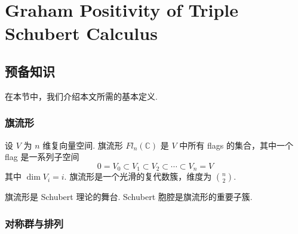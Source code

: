
\chapter{Graham Positivity of Triple Schubert Calculus}
\label{chap:TriplePositivity}

\section{预备知识}
\label{sec:Preliminaries}

在本节中，我们介绍本文所需的基本定义.

\subsection{旗流形}

\begin{Definition}
\label{def:FlagVariety}
设 $V$ 为 $n$ 维复向量空间. 旗流形 $Fl_n(\mathbb{C})$ 是 $V$ 中所有 flags 的集合，其中一个 flag 是一系列子空间
\begin{equation}
0 = V_0 \subset V_1 \subset V_2 \subset \cdots \subset V_n = V
\end{equation}
其中 $\dim V_i = i$. 旗流形是一个光滑的复代数簇，维度为 $\binom{n}{2}$.
\end{Definition}

旗流形是 Schubert 理论的舞台. Schubert 胞腔是旗流形的重要子簇.

\subsection{对称群与排列}

